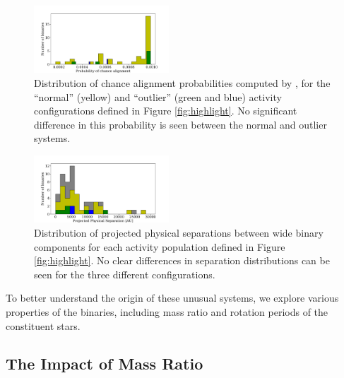 \documentclass[preprint2]{aastex61}
\begin{document}
\begin{figure}[!ht]
\centering
\includegraphics[width=0.45\textwidth]{probhist}
\caption{Distribution of chance alignment probabilities computed by \citet{janes2017}, for the ``normal'' (yellow) and ``outlier'' (green and blue) activity configurations defined in Figure \ref{fig:highlight}. No significant difference in this probability is seen between the normal and outlier systems.
}
\label{fig:janesprob}
\end{figure}

\begin{figure}[!t]
\centering
\includegraphics[width=0.45\textwidth]{sephist}
\caption{Distribution of projected physical separations between wide binary components for each activity population defined in Figure \ref{fig:highlight}. No clear differences in separation distributions can be seen for the three different configurations. 
}
\label{fig:sepdist}
\end{figure}

To better understand the origin of these unusual systems, we explore various properties of the binaries, including mass ratio and rotation periods of the constituent stars.

\subsection{The Impact of Mass Ratio}
\end{document}
